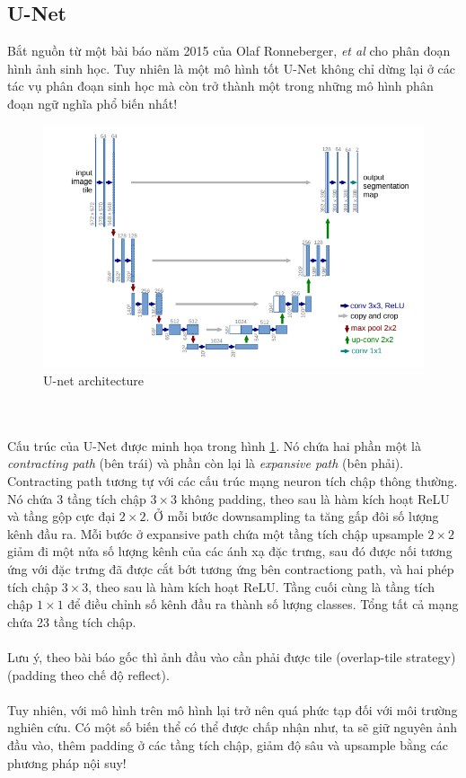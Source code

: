 \documentclass{article}
\begin{document}
\subsection{U-Net}
Bắt nguồn từ một bài báo năm 2015 của Olaf Ronneberger, \textit{et al} cho phân đoạn hình ảnh sinh học. Tuy nhiên là một mô hình tốt U-Net không chỉ dừng lại ở các tác vụ phân đoạn sinh học mà còn trở thành một trong những mô hình phân đoạn ngữ nghĩa phổ biến nhất!
\begin{figure}[ht!]
    \centering
    \includegraphics[width = 0.9\linewidth]{unet.png}
    \caption{U-net architecture}
    \label{fig10}
\end{figure}\\\\
Cấu trúc của U-Net được minh họa trong hình \ref{fig10}. Nó chứa hai phần một là \textit{contracting path} (bên trái) và phần còn lại là \textit{expansive path} (bên phải). Contracting path tương tự với các cấu trúc mạng neuron tích chập thông thường. Nó chứa 3 tầng tích chập $3\times 3$ không padding, theo sau là hàm kích hoạt ReLU và tầng gộp cực đại $2 \times 2$. Ở mỗi bước downsampling ta tăng gấp đôi số lượng kênh đầu ra. Mỗi bước ở expansive path chứa một tầng tích chập upsample $2 \times 2$ giảm đi một nửa số lượng kênh của các ánh xạ đặc trưng, sau đó được nối tương ứng với đặc trưng đã được cắt bớt tương ứng bên contractiong path, và hai phép tích chập $3 \times 3$, theo sau là hàm kích hoạt ReLU. Tầng cuối cùng là tầng tích chập $1 \times 1$ để điều chỉnh số kênh đầu ra thành số lượng classes. Tổng tất cả mạng chứa 23 tầng tích chập.\\\\
Lưu ý, theo bài báo gốc thì ảnh đầu vào cần phải được tile (overlap-tile strategy) (padding theo chế độ reflect).\\\\
Tuy nhiên, với mô hình trên mô hình lại trở nên quá phức tạp đối với môi trường nghiên cứu. Có một số biến thể có thể được chấp nhận như, ta sẽ giữ nguyên ảnh đầu vào, thêm padding ở các tầng tích chập, giảm độ sâu và upsample bằng các phương pháp nội suy!
\end{document}
